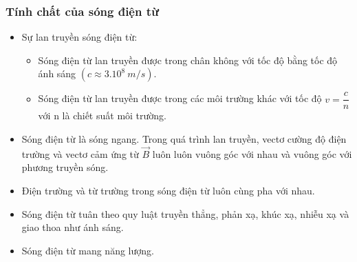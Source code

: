 \subsubsection{Tính chất của sóng điện từ}
\begin{itemize}
\item Sự lan truyền sóng điện từ:
\begin{itemize}
\item Sóng điện từ lan truyền được trong chân không với tốc độ bằng tốc độ ánh sáng $(c\approx3.10^{8}\ m/s)$. 
\item Sóng điện từ lan truyền được trong các môi trường khác với tốc độ $v=\dfrac{c}{n}$ với n là chiết suất môi trường. 
\end{itemize}
\item Sóng điện từ là sóng ngang. Trong quá trình lan truyền, vectơ cường độ điện trường  và vectơ cảm ứng từ $\vec{B}$ luôn luôn vuông góc với nhau và vuông góc với phương truyền sóng. 
\item Điện trường và từ trường trong sóng điện từ luôn cùng pha với nhau.
\item Sóng điện từ tuân theo quy luật truyền thẳng, phản xạ, khúc xạ, nhiễu xạ và giao thoa như ánh sáng.
\item Sóng điện từ mang năng lượng.
\end{itemize}
